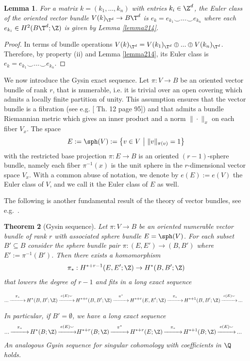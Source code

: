 \documentclass[11pt,a4paper,reqno]{article}
\DeclareMathOperator*{\tttoup}{\xrightarrow{\hspace*{25pt}}}
\numberwithin{equation}{section}
\newtheorem{theorem}{Theorem}[section]
\newtheorem{lemma}[theorem]{Lemma}
\theoremstyle{definition}
\begin{document}
\begin{lemma}\label{lemmanew}
For a matrix $k=(k_1,...,k_n)$ with entries $k_i\in\Z^d$, the Euler class of the oriented vector bundle $V(k)_{\T^d} \to B\T^d$ is 
$e_k=e_{k_1}\smallsmile...\smallsmile e_{k_n}$ where 
each  $e_{k_i} \in H^2(B\T^d;\Z) $ is given by Lemma \ref{lemma214}.
\end{lemma}

\begin{proof}
In  terms of bundle operations 
$ V(k)_{\T^d}=V(k_1)_{\T^d}\oplus...\oplus V(k_n)_{\T^d} $. 
Therefore,  by property (ii) and Lemma \ref{lemma214}, its Euler class is  
$e_k=e_{k_1}\smallsmile...\smallsmile e_{k_n}$.
\end{proof}

We now introduce  the Gysin exact sequence. 
Let $\pi:V\to B$ be an oriented vector bundle of rank $r $, that is  numerable,  i.e. it is trivial over an open covering which admits a locally finite partition of unity.
This assumption ensures that the vector bundle is a fibration (see e.g. \cite{Spanier}[ Th. 12 page 95]) and that admits a  bundle Riemannian metric which gives an inner product and a norm $\|\cdot\|_x$ on each fiber $V_x$. The space  
\[
E:=\sph(V):=\big\{v\in V\ \big|\ 
\| v \|_{\pi(v)}=1 \big\} 
\] 
with the  restricted base projection $\pi:E\to B$ is an oriented $(r-1)$-sphere bundle, namely each fiber $ \pi^{-1}(x) $ is the unit 
sphere in 
the $r$-dimensional vector space $ V_x $. With a common abuse of notation, we denote by $e(E):=e(V)$ the Euler class of $V$, and we call it the Euler class of $E$ as well. 

The following is another fundamental result of the theory of  vector bundles, see e.g.\ \cite[Th.~3, page 483]{Spanier}.
 


\begin{theorem}[Gysin sequence]
\label{t:Gysin}
Let $\pi:V\to B$ be an oriented numerable vector bundle of rank $r$ with associated sphere bundle $ E = \sph(V) $.  
For each subset $B'\subseteq B$  consider the sphere bundle pair $\pi:(E,E')\to(B,B')$
where $E':=\pi^{-1}(B')$.
Then there exists a homomorphism
\[ 
\pi_{*}:H^{*+r-1}(E,E';\Z) \to H^{*}(B,B';\Z)
\] 
that lowers the degree of $r-1$ and fits in a long exact sequence 
\begin{small}
\begin{align*}
 ...\tttoup^{\pi_*} H^*(B,B';\Z)&\tttoup^{e(E)\smallsmile} H^{*+r}(B,B';\Z)\tttoup^{\pi^*} H^{*+r}(E,E';\Z) \tttoup^{\pi_*} H^{*+1}(B,B';\Z) \tttoup ^{e(E)\smallsmile} ...
\end{align*}    
\end{small}
In particular, if $B'=\emptyset$, we have a long exact sequence
\begin{align}
 ...\tttoup^{\pi_*} H^*(B;\Z)\tttoup^{e(E)\smallsmile} &H^{*+r}(B;\Z)\tttoup^{\pi^*} H^{*+r}(E;\Z) \tttoup^{\pi_*} H^{*+1}(B;\Z) \tttoup ^{e(E)\smallsmile} ...
\label{eq:gysin} 
 \end{align}
An analogous Gysin sequence for singular cohomology with coefficients in $\Q$ holds.
\end{theorem}
\end{document}
